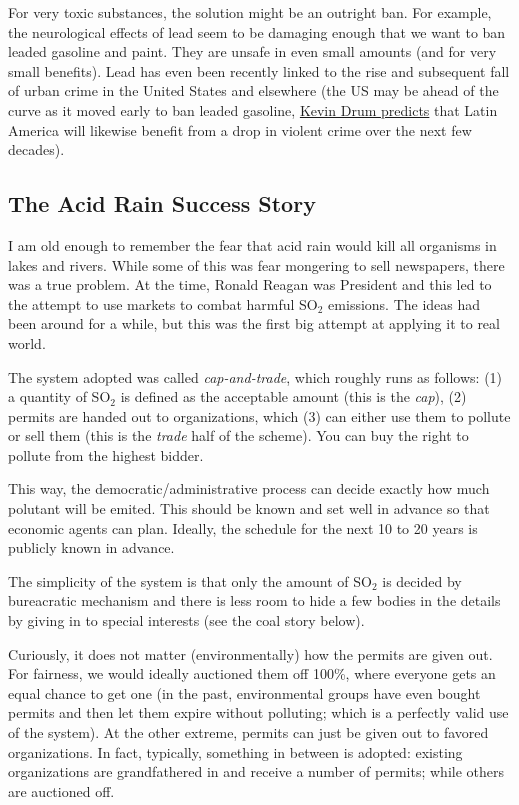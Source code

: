 For very toxic substances, the solution might be an outright ban. For example,
the neurological effects of lead seem to be damaging enough that we want to ban
leaded gasoline and paint. They are unsafe in even small amounts (and for very
small benefits). Lead has even been recently linked to the rise and subsequent
fall of urban crime in the United States and elsewhere (the US may be ahead of
the curve as it moved early to ban leaded gasoline,
\href{http://www.motherjones.com/kevin-drum/2013/01/lead-and-crime-ill-be-melissa-harris-perry-show-sunday-10-am}{Kevin
Drum predicts} that Latin America will likewise benefit from a drop in violent
crime over the next few decades).

\subsection{The Acid Rain Success Story}

I am old enough to remember the fear that acid rain would kill all organisms in
lakes and rivers. While some of this was fear mongering to sell newspapers,
there was a true problem. At the time, Ronald Reagan was President and this led
to the attempt to use markets to combat harmful SO${}_2$ emissions. The ideas
had been around for a while, but this was the first big attempt at applying it
to real world.

The system adopted was called \emph{cap-and-trade}, which roughly runs as
follows: (1) a quantity of SO${}_2$ is defined as the acceptable amount (this
is the \emph{cap}), (2) permits are handed out to organizations, which (3) can
either use them to pollute or sell them (this is the \emph{trade} half of the
scheme). You can buy the right to pollute from the highest bidder.

This way, the democratic/administrative process can decide exactly how much
polutant will be emited. This should be known and set well in advance so that
economic agents can plan. Ideally, the schedule for the next 10 to 20 years
is publicly known in advance.

The simplicity of the system is that only the amount of SO${}_2$ is decided by
bureacratic mechanism and there is less room to hide a few bodies in the
details by giving in to special interests (see the coal story below).

Curiously, it does not matter (environmentally) how the permits are given out.
For fairness, we would ideally auctioned them off 100\%, where everyone gets an
equal chance to get one (in the past, environmental groups have even bought
permits and then let them expire without polluting; which is a perfectly valid
use of the system). At the other extreme, permits can just be given out to
favored organizations. In fact, typically, something in between is adopted:
existing organizations are grandfathered in and receive a number of permits;
while others are auctioned off.


